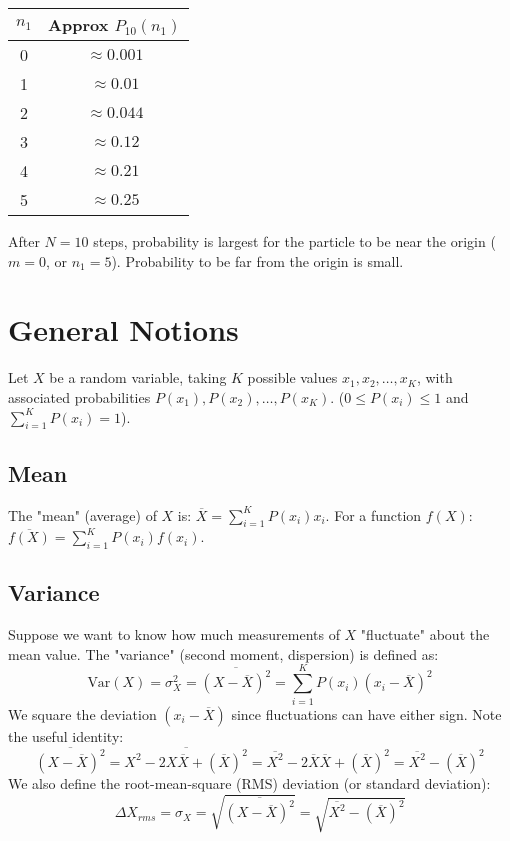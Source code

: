 \documentclass[11pt]{article}
\newcommand{\avg}[1]{\overline{#1}}
\begin{document}
\begin{center}
\begin{tabular}{cc}
\toprule
$n_1$ & Approx $P_{10}(n_1)$ \\
\midrule
0 & $\approx 0.001$ \\
1 & $\approx 0.01$ \\
2 & $\approx 0.044$ \\
3 & $\approx 0.12$ \\
4 & $\approx 0.21$ \\
5 & $\approx 0.25$ \\
\bottomrule
\end{tabular}
\end{center}

After $N=10$ steps, probability is largest for the particle to be near the origin ($m=0$, or $n_1=5$). Probability to be far from the origin is small.

\section*{General Notions}

Let $X$ be a random variable, taking $K$ possible values $x_1, x_2, \dots, x_K$, with associated probabilities $P(x_1), P(x_2), \dots, P(x_K)$.
($0 \le P(x_i) \le 1$ and $\sum_{i=1}^{K} P(x_i) = 1$).

\subsection*{Mean}
The "mean" (average) of $X$ is: $\avg{X} = \sum_{i=1}^{K} P(x_i) x_i$.
For a function $f(X)$: $\avg{f(X)} = \sum_{i=1}^{K} P(x_i) f(x_i)$.

\subsection*{Variance}
Suppose we want to know how much measurements of $X$ "fluctuate" about the mean value.
The "variance" (second moment, dispersion) is defined as:
\[ \text{Var}(X) = \sigma_X^2 = \avg{(X - \avg{X})^2} = \sum_{i=1}^{K} P(x_i) (x_i - \avg{X})^2 \]
We square the deviation $(x_i - \avg{X})$ since fluctuations can have either sign.
Note the useful identity:
\[ \avg{(X - \avg{X})^2} = \avg{X^2 - 2X\avg{X} + (\avg{X})^2} = \avg{X^2} - 2\avg{X}\avg{X} + (\avg{X})^2 = \avg{X^2} - (\avg{X})^2 \]
We also define the root-mean-square (RMS) deviation (or standard deviation):
\[ \Delta X_{rms} = \sigma_X = \sqrt{\avg{(X - \avg{X})^2}} = \sqrt{\avg{X^2} - (\avg{X})^2} \]
\end{document}
